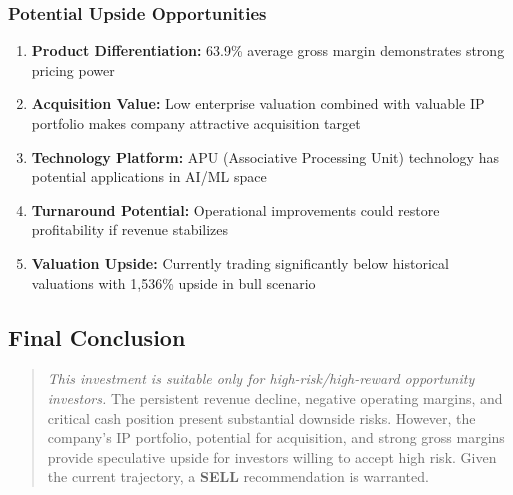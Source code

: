 \documentclass[11pt,a4paper]{article}
\begin{document}
\vspace{0.5cm}

\subsubsection{Potential Upside Opportunities}

\begin{enumerate}
\setlength{\itemsep}{0.4em}
\item \textbf{Product Differentiation:} 63.9\% average gross margin demonstrates strong pricing power
\item \textbf{Acquisition Value:} Low enterprise valuation combined with valuable IP portfolio makes company attractive acquisition target
\item \textbf{Technology Platform:} APU (Associative Processing Unit) technology has potential applications in AI/ML space
\item \textbf{Turnaround Potential:} Operational improvements could restore profitability if revenue stabilizes
\item \textbf{Valuation Upside:} Currently trading significantly below historical valuations with 1,536\% upside in bull scenario
\end{enumerate}

\vspace{0.5cm}

\subsection{Final Conclusion}

\begin{quote}
\textit{This investment is suitable only for high-risk/high-reward opportunity investors.} The persistent revenue decline, negative operating margins, and critical cash position present substantial downside risks. However, the company's IP portfolio, potential for acquisition, and strong gross margins provide speculative upside for investors willing to accept high risk. Given the current trajectory, a \textbf{SELL} recommendation is warranted.
\end{quote}
\end{document}
